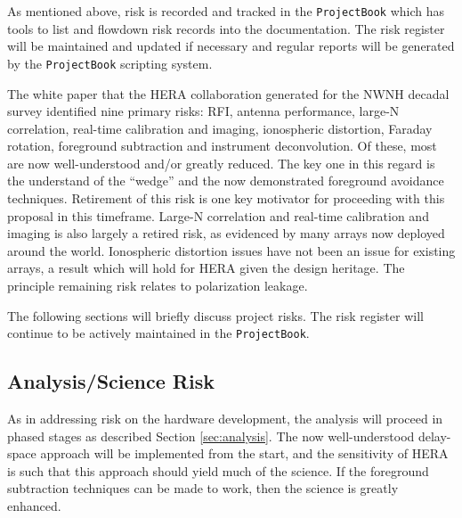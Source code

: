 \documentclass[preprint]{aastex}
\begin{document}
As mentioned above, risk is recorded and tracked in the {\tt ProjectBook} which has tools 
to list and flowdown risk records into the documentation.  The risk register will be 
maintained and updated if necessary and regular reports will be generated by the
{\tt ProjectBook} scripting system.

The white paper that the HERA collaboration generated for the NWNH decadal survey identified nine
primary risks:  RFI, antenna performance, large-N correlation, real-time calibration and imaging, 
ionospheric distortion, Faraday rotation, foreground subtraction and instrument deconvolution.
Of these, most are now well-understood and/or greatly reduced.  The key one in this regard is
the understand of the ``wedge'' and the now demonstrated foreground avoidance techniques.
Retirement of this risk is one key motivator for proceeding with this proposal in this
timeframe.  Large-N correlation and real-time calibration and imaging is also largely a
retired risk, as evidenced by many arrays now deployed around the world.  Ionospheric
distortion issues have not been an issue for existing arrays, a result which will hold for
HERA given the design heritage.  The principle remaining risk relates to polarization leakage.

The following sections will briefly discuss project risks.  The risk register will continue to be
actively maintained in the {\tt ProjectBook}.

\subsection{Analysis/Science Risk}
As in addressing risk on the hardware development, the analysis will proceed in
phased stages as described Section \ref{sec:analysis}. The now well-understood
delay-space approach will be implemented from the start, and the sensitivity of HERA
is such that this approach should yield much of the science. If the foreground
subtraction techniques can be made to work, then the science is greatly enhanced.
\end{document}
